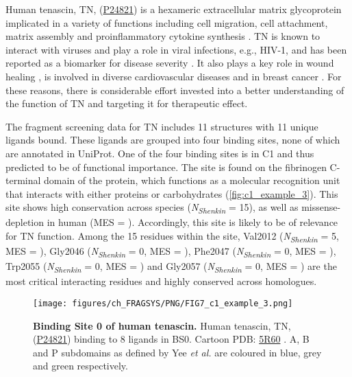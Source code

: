 {Human tenascin, TN, (\href{https://www.uniprot.org/uniprotkb/P24821/entry}{P24821}) is a hexameric extracellular matrix glycoprotein implicated in a variety of functions including cell migration, cell attachment, matrix assembly and proinflammatory cytokine synthesis \cite{BHATTACHARYYA_2022_TNC}. TN is known to interact with viruses and play a role in viral infections, e.g., HIV-1, and has been reported as a biomarker for disease severity \cite{ZULIANI_2023_TNC}. It also plays a key role in wound healing \cite{WANG_2022_TNC}, is involved in diverse cardiovascular diseases \cite{KHOMTCHOUK_2022_TNC} and in breast cancer \cite{LEPUCKI_2022_TNC}. For these reasons, there is considerable effort invested into a better understanding of the function of TN and targeting it for therapeutic effect.

The fragment screening data for TN includes 11 structures with 11 unique ligands bound. These ligands are grouped into four binding sites, none of which are annotated in UniProt. One of the four binding sites is in C1 and thus predicted to be of functional importance. The site is found on the fibrinogen C-terminal domain of the protein, which functions as a molecular recognition unit that interacts with either proteins or carbohydrates (\autoref{fig:c1_example_3}). This site shows high conservation across species (\textit{N\textsubscript{Shenkin}} = 15), as well as missense-depletion in human (MES = ). Accordingly, this site is likely to be of relevance for TN function. Among the 15 residues within the site, Val2012 (\textit{N\textsubscript{Shenkin}} = 5, MES = ), Gly2046 (\textit{N\textsubscript{Shenkin}} = 0, MES = ), Phe2047 (\textit{N\textsubscript{Shenkin}} = 0, MES = ), Trp2055 (\textit{N\textsubscript{Shenkin}} = 0, MES = ) and Gly2057 (\textit{N\textsubscript{Shenkin}} = 0, MES = ) are the most critical interacting residues and highly conserved across homologues.

\begin{figure}[htb!]
    \centering
    \texttt{[image: figures/ch\_FRAGSYS/PNG/FIG7\_c1\_example\_3.png]}
    \caption[Binding Site 0 of human tenascin]{\textbf{Binding Site 0 of human tenascin.} Human tenascin, TN, (\href{https://www.uniprot.org/uniprotkb/P24821/entry}{P24821}) binding to 8 ligands in BS0. Cartoon PDB: \href{https://www.ebi.ac.uk/pdbe/entry/pdb/5r60}{5R60} \cite{PDB_5R60}. A, B and P subdomains as defined by Yee \textit{et al.} \cite{YEE_1997_FIBRINOGEN} are coloured in blue, grey and green respectively.}
    \label{fig:c1_example_3}
\end{figure}

}
